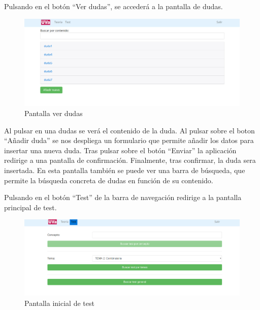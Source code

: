 \documentclass[openright,twoside,10pt]{book}
\begin{document}
    Pulsando en el botón \enquote{Ver dudas}, se accederá a la pantalla de
    dudas.
    
    \begin{figure}[H]
        \begin{center}
            \includegraphics[width=\textwidth]{img/manual/alumno-teoria3.png}
        \end{center}
        \caption{Pantalla ver dudas}
    \end{figure}
    
    Al pulsar en una dudas se verá el contenido de la duda. Al pulsar sobre
    el boton \enquote{Añadir duda} se nos despliega un formulario que
    permite añadir los datos para insertar una nueva duda. Tras pulsar sobre
    el botón \enquote{Enviar} la aplicación redirige a una pantalla de
    confirmación. Finalmente, tras confirmar, la duda sera insertada. En
    esta pantalla también se puede ver una barra de búsqueda, que permite la
    búsqueda concreta de dudas en función de su contenido.
    
    Pulsando en el botón \enquote{Test} de la barra de navegación redirige a
    la pantalla principal de test.
    
    \begin{figure}[H]
        \begin{center}
            \includegraphics[width=\textwidth]{img/manual/alumno-test4.png}
        \end{center}
        \caption{Pantalla inicial de test}
    \end{figure}
    
\end{document}
